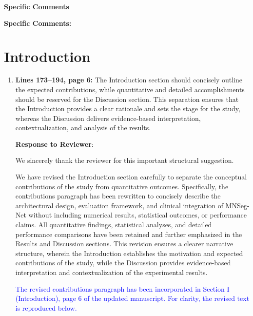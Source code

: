 \documentclass[12pt,letterpaper]{article}
\begin{document}
\begin{center}
{\bf Specific Comments}
\end{center}


\noindent\textbf{Specific Comments:}

\section*{Introduction}

\begin{enumerate}
    \item \textbf{Lines 173--194, page 6:} The Introduction section should concisely outline the expected contributions, while quantitative and detailed accomplishments should be reserved for the Discussion section. This separation ensures that the Introduction provides a clear rationale and sets the stage for the study, whereas the Discussion delivers evidence-based interpretation, contextualization, and analysis of the results.

    

    \textbf{Response to Reviewer}:


We sincerely thank the reviewer for this important structural suggestion. 

We have revised the Introduction section carefully to separate the conceptual contributions of the study from quantitative outcomes. Specifically, the contributions paragraph has been rewritten to concisely describe the architectural design, evaluation framework, and clinical integration of MNSeg-Net without including numerical results, statistical outcomes, or performance claims. All quantitative findings, statistical analyses, and detailed performance comparisons have been retained and further emphasized in the Results and Discussion sections. This revision ensures a clearer narrative structure, wherein the Introduction establishes the motivation and expected contributions of the study, while the Discussion provides evidence-based interpretation and contextualization of the experimental results.


\textcolor{blue}{The revised contributions paragraph has been incorporated in Section I (Introduction), page 6 of the updated manuscript.  For clarity, the revised text is reproduced below. }






\end{enumerate}
\end{document}
